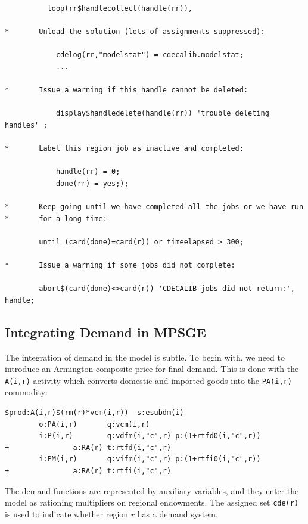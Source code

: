 \begin{Verbatim}
          loop(rr$handlecollect(handle(rr)),

*       Unload the solution (lots of assignments suppressed):

            cdelog(rr,"modelstat") = cdecalib.modelstat;
            ...

*       Issue a warning if this handle cannot be deleted:

            display$handledelete(handle(rr)) 'trouble deleting handles' ;

*       Label this region job as inactive and completed:

            handle(rr) = 0;
            done(rr) = yes;);

*       Keep going until we have completed all the jobs or we have run
*       for a long time:

        until (card(done)=card(r)) or timeelapsed > 300;  

*       Issue a warning if some jobs did not complete:

        abort$(card(done)<>card(r)) 'CDECALIB jobs did not return:', handle;
\end{Verbatim}

\subsection*{Integrating \CDE Demand in MPSGE}

The integration of \CDE demand in the \MPSGE model is subtle. To
begin with, we need to introduce an Armington composite price for
final demand. This is done with the \texttt{A(i,r)} activity which
converts domestic and imported goods into the \texttt{PA(i,r)} commodity:
\begin{Verbatim}
$prod:A(i,r)$(rm(r)*vcm(i,r))  s:esubdm(i)  
        o:PA(i,r)       q:vcm(i,r)
        i:P(i,r)        q:vdfm(i,"c",r) p:(1+rtfd0(i,"c",r)) 
+               a:RA(r) t:rtfd(i,"c",r)
        i:PM(i,r)       q:vifm(i,"c",r) p:(1+rtfi0(i,"c",r)) 
+               a:RA(r) t:rtfi(i,"c",r)
\end{Verbatim}

The \CDE demand functions are represented by auxiliary variables, and
they enter the \MPSGE model as rationing multipliers on regional
endowments. The assigned set \texttt{cde(r)} is used to indicate
whether region $r$ has a \CDE demand system.  

